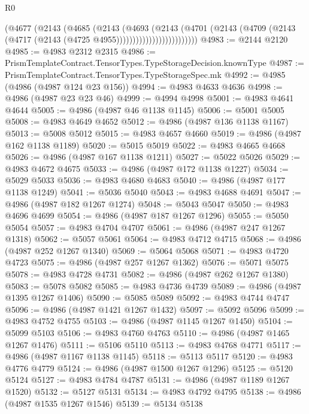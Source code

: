 \begin{lexlean}{R0}
\begin{coremodule}
                            (@4677
                              (@2143
                                (@4685
                                  (@2143
                                    (@4693
                                      (@2143
                                        (@4701
                                          (@2143
                                            (@4709
                                              (@2143
                                                (@4717 (@2143 (@4725 @4955)))))))))))))))))))))))))
@4983 := @2144 @2120
@4985 := @4983 @2312 @2315
@4986 := PrismTemplateContract.TensorTypes.TypeStorageDecision.knownType
@4987 := PrismTemplateContract.TensorTypes.TypeStorageSpec.mk
@4992 := @4985 (@4986 (@4987 @124 @23 @156))
@4994 := @4983 @4633 @4636
@4998 := @4986 (@4987 @23 @23 @46)
@4999 := @4994 @4998
@5001 := @4983 @4641 @4644
@5005 := @4986 (@4987 @46 @1138 @1145)
@5006 := @5001 @5005
@5008 := @4983 @4649 @4652
@5012 := @4986 (@4987 @136 @1138 @1167)
@5013 := @5008 @5012
@5015 := @4983 @4657 @4660
@5019 := @4986 (@4987 @162 @1138 @1189)
@5020 := @5015 @5019
@5022 := @4983 @4665 @4668
@5026 := @4986 (@4987 @167 @1138 @1211)
@5027 := @5022 @5026
@5029 := @4983 @4672 @4675
@5033 := @4986 (@4987 @172 @1138 @1227)
@5034 := @5029 @5033
@5036 := @4983 @4680 @4683
@5040 := @4986 (@4987 @177 @1138 @1249)
@5041 := @5036 @5040
@5043 := @4983 @4688 @4691
@5047 := @4986 (@4987 @182 @1267 @1274)
@5048 := @5043 @5047
@5050 := @4983 @4696 @4699
@5054 := @4986 (@4987 @187 @1267 @1296)
@5055 := @5050 @5054
@5057 := @4983 @4704 @4707
@5061 := @4986 (@4987 @247 @1267 @1318)
@5062 := @5057 @5061
@5064 := @4983 @4712 @4715
@5068 := @4986 (@4987 @252 @1267 @1340)
@5069 := @5064 @5068
@5071 := @4983 @4720 @4723
@5075 := @4986 (@4987 @257 @1267 @1362)
@5076 := @5071 @5075
@5078 := @4983 @4728 @4731
@5082 := @4986 (@4987 @262 @1267 @1380)
@5083 := @5078 @5082
@5085 := @4983 @4736 @4739
@5089 := @4986 (@4987 @1395 @1267 @1406)
@5090 := @5085 @5089
@5092 := @4983 @4744 @4747
@5096 := @4986 (@4987 @1421 @1267 @1432)
@5097 := @5092 @5096
@5099 := @4983 @4752 @4755
@5103 := @4986 (@4987 @1145 @1267 @1450)
@5104 := @5099 @5103
@5106 := @4983 @4760 @4763
@5110 := @4986 (@4987 @1465 @1267 @1476)
@5111 := @5106 @5110
@5113 := @4983 @4768 @4771
@5117 := @4986 (@4987 @1167 @1138 @1145)
@5118 := @5113 @5117
@5120 := @4983 @4776 @4779
@5124 := @4986 (@4987 @1500 @1267 @1296)
@5125 := @5120 @5124
@5127 := @4983 @4784 @4787
@5131 := @4986 (@4987 @1189 @1267 @1520)
@5132 := @5127 @5131
@5134 := @4983 @4792 @4795
@5138 := @4986 (@4987 @1535 @1267 @1546)
@5139 := @5134 @5138

\end{coremodule}
\end{lexlean}
